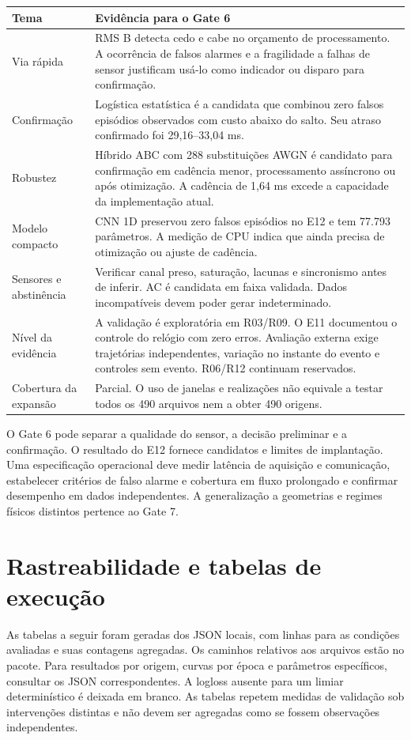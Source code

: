 \documentclass[11pt,a4paper]{article}
\begin{document}
\begin{longtable}{@{}p{.23\linewidth}p{.69\linewidth}@{}}
\toprule Tema & Evidência para o Gate 6\\\midrule\endhead
Via rápida & RMS B detecta cedo e cabe no orçamento de processamento. A ocorrência de falsos alarmes e a fragilidade a falhas de sensor justificam usá-lo como indicador ou disparo para confirmação.\\
Confirmação & Logística estatística é a candidata que combinou zero falsos episódios observados com custo abaixo do salto. Seu atraso confirmado foi 29,16--33,04 ms.\\
Robustez & Híbrido ABC com 288 substituições AWGN é candidato para confirmação em cadência menor, processamento assíncrono ou após otimização. A cadência de 1,64 ms excede a capacidade da implementação atual.\\
Modelo compacto & CNN 1D preservou zero falsos episódios no E12 e tem 77.793 parâmetros. A medição de CPU indica que ainda precisa de otimização ou ajuste de cadência.\\
Sensores e abstinência & Verificar canal preso, saturação, lacunas e sincronismo antes de inferir. AC é candidata em faixa validada. Dados incompatíveis devem poder gerar indeterminado.\\
Nível da evidência & A validação é exploratória em R03/R09. O E11 documentou o controle do relógio com zero erros. Avaliação externa exige trajetórias independentes, variação no instante do evento e controles sem evento. R06/R12 continuam reservados.\\
Cobertura da expansão & Parcial. O uso de janelas e realizações não equivale a testar todos os 490 arquivos nem a obter 490 origens.\\
\bottomrule
\end{longtable}
O Gate 6 pode separar a qualidade do sensor, a decisão preliminar e a confirmação. O resultado do E12 fornece candidatos e limites de implantação. Uma especificação operacional deve medir latência de aquisição e comunicação, estabelecer critérios de falso alarme e cobertura em fluxo prolongado e confirmar desempenho em dados independentes. A generalização a geometrias e regimes físicos distintos pertence ao Gate 7.

\appendix
\section{Rastreabilidade e tabelas de execução}
As tabelas a seguir foram geradas dos JSON locais, com linhas para as condições avaliadas e suas contagens agregadas. Os caminhos relativos aos arquivos estão no pacote. Para resultados por origem, curvas por época e parâmetros específicos, consultar os JSON correspondentes. A logloss ausente para um limiar determinístico é deixada em branco. As tabelas repetem medidas de validação sob intervenções distintas e não devem ser agregadas como se fossem observações independentes.

\clearpage
\end{document}
